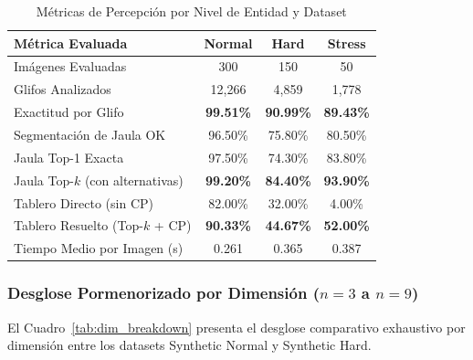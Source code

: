 \begin{table}[htbp]
\caption{M\'etricas de Percepci\'on por Nivel de Entidad y Dataset}
\label{tab:global_metrics}
\centering
\footnotesize
\setlength{\tabcolsep}{3.0pt}
\begin{tabular}{@{}lccc@{}}
\toprule
\textbf{M\'etrica Evaluada} & \textbf{Normal} & \textbf{Hard} & \textbf{Stress} \\
\midrule
Im\'agenes Evaluadas & 300 & 150 & 50 \\
Glifos Analizados & 12{,}266 & 4{,}859 & 1{,}778 \\
Exactitud por Glifo & \textbf{99.51\%} & \textbf{90.99\%} & \textbf{89.43\%} \\
Segmentaci\'on de Jaula OK & 96.50\% & 75.80\% & 80.50\% \\
Jaula Top-1 Exacta & 97.50\% & 74.30\% & 83.80\% \\
Jaula Top-$k$ (con alternativas) & \textbf{99.20\%} & \textbf{84.40\%} & \textbf{93.90\%} \\
Tablero Directo (sin CP) & 82.00\% & 32.00\% & 4.00\% \\
Tablero Resuelto (Top-$k$ + CP) & \textbf{90.33\%} & \textbf{44.67\%} & \textbf{52.00\%} \\
Tiempo Medio por Imagen (s) & 0.261 & 0.365 & 0.387 \\
\bottomrule
\end{tabular}
\end{table}

\subsubsection{Desglose Pormenorizado por Dimensi\'on \texorpdfstring{($n=3$ a $n=9$)}{(n=3 a n=9)}}
El Cuadro~\ref{tab:dim_breakdown} presenta el desglose comparativo exhaustivo por dimensi\'on entre los datasets Synthetic Normal y Synthetic Hard.

